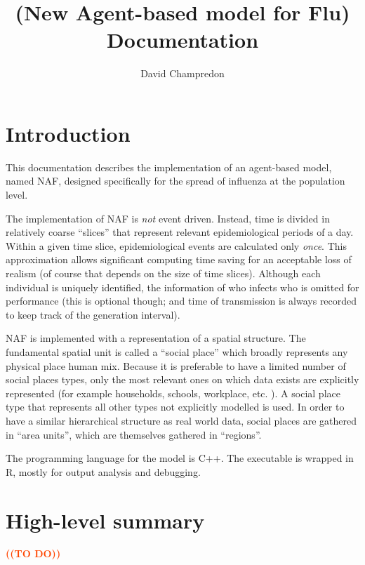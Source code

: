 \documentclass[11pt, onecolumn]{article}
\title{\naf (New Agent-based model for Flu) Documentation}
\author{David Champredon}
\newcommand{\warning}[1]{\textbf{\textcolor{OrangeRed}{#1}}}
\newcommand{\naf}{\textsf{NAF}\xspace}
\begin{document}
\maketitle

\vspace{1cm}

\tableofcontents

\newpage

\section{Introduction}

This documentation describes the implementation of an agent-based model, named \naf, designed specifically for the spread of influenza at the population level. 

The implementation of \naf is \emph{not} event driven. Instead, time is divided in relatively coarse ``slices'' that represent relevant epidemiological periods of a day. Within a given time slice, epidemiological events are calculated only \emph{once}. This approximation allows significant computing time saving for an acceptable loss of realism (of course that depends on the size of time slices). Although each individual is uniquely identified, the information of who infects who is omitted for performance (this is optional though; and time of transmission is always recorded to keep track of the generation interval). 


\naf is implemented with a representation of a spatial structure. The fundamental spatial unit is called a ``social place'' which broadly represents any physical place human mix. Because it is preferable to have a limited number of social places types, only the most relevant ones on which data exists are explicitly represented (for example households, schools, workplace, etc. ). A social place type that represents all other types not explicitly modelled is used. 
In order to have a similar hierarchical structure as real world data, social places are gathered in ``area units'', which are themselves gathered in ``regions''.

The programming language for the model is C++. The executable is wrapped in R, mostly for output analysis and debugging.

\section{High-level summary}

\warning{((TO DO))}
\end{document}
